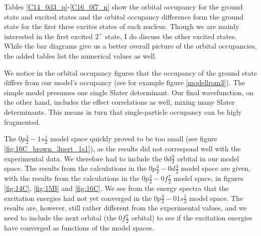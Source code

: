 Tables \ref{C14_0d3_p}-\ref{C16_0f7_n} show the orbital occupancy for the
ground state and excited  states and the orbital occupancy difference form the
ground state for the first three excites states of each nucleus. Though we are
mainly interested in the first excited $2^+$ state, I do discuss the other
excited states. While the bar diagrams give us a better overall picture of the
orbital occupancies, the added tables list the  numerical values as well.

We notice in the orbital occupancy figures that the occupancy of the ground
state differs from our model's occupancy (see for example figure
\ref{modellrom3}). 
The simple model presumes one single Slater determinant.
Our final
wavefunction, on the other hand, includes the effect correlations as well, mixing many 
Slater determinants.  This means in turn that single-particle occupancy can be higly fragmented.



The $0p\frac32-1s\frac12$ model space quickly proved to be too small (see
figure \ref{fig:16C_brown_3pert_1s1}), as the results did not correspond well
with the experimental data. We therefore had to include the $0d\frac32$ orbital
in our model space. The results from the calculations in the
$0p\frac32-0d\frac32$ model space are given, with the results from the
calculations in the $0p\frac32-0f\frac72$ model space, in figures
\ref{fig:14C}, \ref{fig:15B} and \ref{fig:16C}. We see from the
energy spectra that the excitation energies had not yet converged in the
$0p\frac32-01s\frac12$ model space. The results are, however, still rather
different from the experimental values, and we need to include the next orbital
(the $0f\frac72$ orbital) to see if the excitation energies have converged as functions
of the model spaces.

